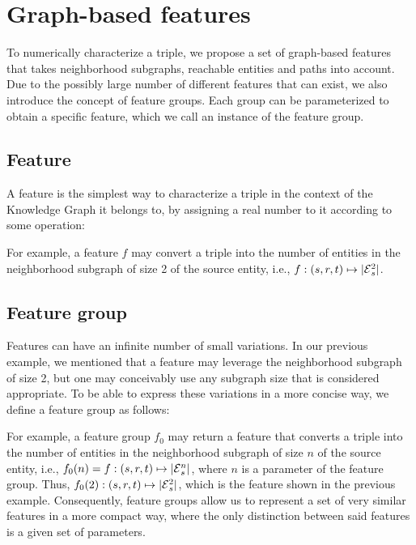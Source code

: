 \section{Graph-based features}\label{sec:theo-features}
To numerically characterize a triple, we propose a set of graph-based features that takes neighborhood subgraphs, reachable entities and paths into account. Due to the possibly large number of different features that can exist, we also introduce the concept of feature groups. Each group can be parameterized to obtain a specific feature, which we call an instance of the feature group.

\subsection{Feature}
A feature is the simplest way to characterize a triple in the context of the Knowledge Graph it belongs to, by assigning a real number to it according to some operation:


For example, a feature $f$ may convert a triple into the number of entities in the neighborhood subgraph of size 2 of the source entity, i.e., $f : (s, r, t) \mapsto |\mathcal{E}{}_s^2|$.

\subsection{Feature group}
Features can have an infinite number of small variations. In our previous example, we mentioned that a feature may leverage the neighborhood subgraph of size 2, but one may conceivably use any subgraph size that is considered appropriate. To be able to express these variations in a more concise way, we define a feature group as follows:


For example, a feature group $f_0$ may return a feature that converts a triple into the number of entities in the neighborhood subgraph of size $n$ of the source entity, i.e., $f_0(n) = f : (s, r, t) \mapsto |\mathcal{E}{}_s^n|$, where $n$ is a parameter of the feature group. Thus, $f_0(2) : (s, r, t) \mapsto |\mathcal{E}{}_s^2|$, which is the feature shown in the previous example. Consequently, feature groups allow us to represent a set of very similar features in a more compact way, where the only distinction between said features is a given set of parameters.

